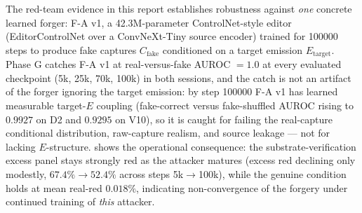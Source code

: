 The red-team evidence in this report establishes robustness against \emph{one} concrete learned forger: F-A v1, a 42.3M-parameter ControlNet-style editor (EditorControlNet over a ConvNeXt-Tiny source encoder) trained for \num{100000} steps to produce fake captures $C_\text{fake}$ conditioned on a target emission $E_\text{target}$. Phase G catches F-A v1 at real-versus-fake AUROC $=1.0$ at every evaluated checkpoint (5k, 25k, 70k, 100k) in both sessions, and the catch is not an artifact of the forger ignoring the target emission: by step \num{100000} F-A v1 has learned measurable target-$E$ coupling (fake-correct versus fake-shuffled AUROC rising to $0.9927$ on D2 and $0.9295$ on V10), so it is caught for failing the real-capture conditional distribution, raw-capture realism, and source leakage --- not for lacking $E$-structure.  shows the operational consequence: the substrate-verification excess panel stays strongly red as the attacker matures (excess red declining only modestly, $67.4\% \rightarrow 52.4\%$ across steps 5k$\rightarrow$100k), while the genuine condition holds at mean real-red $0.018\%$, indicating non-convergence of the forgery under continued training of \emph{this} attacker.

